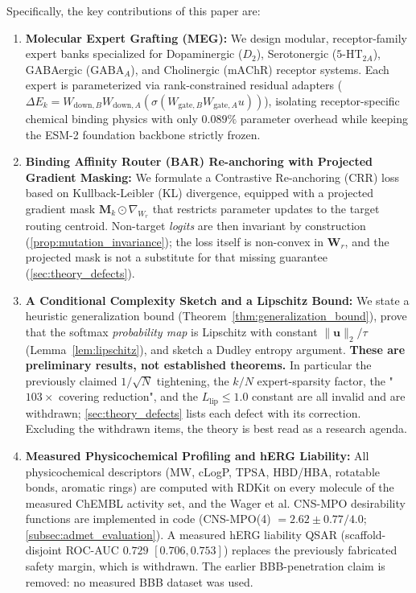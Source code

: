 \documentclass{article}
\theoremstyle{definition}
\begin{document}
Specifically, the key contributions of this paper are:
\begin{enumerate}[leftmargin=1.5em,noitemsep]
    \item \textbf{Molecular Expert Grafting (MEG):} We design modular, receptor-family expert banks specialized for Dopaminergic ($D_2$), Serotonergic ($5\text{-HT}_{2A}$), GABAergic ($\text{GABA}_A$), and Cholinergic ($\text{mAChR}$) receptor systems. Each expert is parameterized via rank-constrained residual adapters ($\Delta E_k = W_{\text{down}, B} W_{\text{down}, A} (\sigma(W_{\text{gate}, B} W_{\text{gate}, A} u))$), isolating receptor-specific chemical binding physics with only $0.089\%$ parameter overhead while keeping the ESM-2 foundation backbone strictly frozen.
    \item \textbf{Binding Affinity Router (BAR) Re-anchoring with Projected Gradient Masking:} We formulate a Contrastive Re-anchoring (CRR) loss based on Kullback-Leibler (KL) divergence, equipped with a projected gradient mask $\mathbf{M}_k \odot \nabla_{W_r}$ that restricts parameter updates to the target routing centroid. Non-target \emph{logits} are then invariant by construction (\cref{prop:mutation_invariance}); the loss itself is non-convex in $\mathbf{W}_r$, and the projected mask is not a substitute for that missing guarantee (\cref{sec:theory_defects}).
    \item \textbf{A Conditional Complexity Sketch and a Lipschitz Bound:} We state a heuristic generalization bound (Theorem~\ref{thm:generalization_bound}), prove that the softmax \emph{probability map} is Lipschitz with constant $\|\mathbf{u}\|_2/\tau$ (Lemma~\ref{lem:lipschitz}), and sketch a Dudley entropy argument. \textbf{These are preliminary results, not established theorems.} In particular the previously claimed $1/\sqrt{N}$ tightening, the $k/N$ expert-sparsity factor, the "$103\times$ covering reduction", and the $L_{\text{lip}} \le 1.0$ constant are all invalid and are withdrawn; \cref{sec:theory_defects} lists each defect with its correction. Excluding the withdrawn items, the theory is best read as a research agenda.
    \item \textbf{Measured Physicochemical Profiling and hERG Liability:} All physicochemical descriptors (MW, cLogP, TPSA, HBD/HBA, rotatable bonds, aromatic rings) are computed with RDKit on every molecule of the measured ChEMBL activity set, and the Wager et al. CNS-MPO desirability functions are implemented in code (CNS-MPO(4) $= 2.62 \pm 0.77 / 4.0$; \cref{subsec:admet_evaluation}). A measured hERG liability QSAR (scaffold-disjoint ROC-AUC $0.729$ $[0.706, 0.753]$) replaces the previously fabricated safety margin, which is withdrawn. The earlier BBB-penetration claim is removed: no measured BBB dataset was used.

\end{enumerate}
\end{document}
